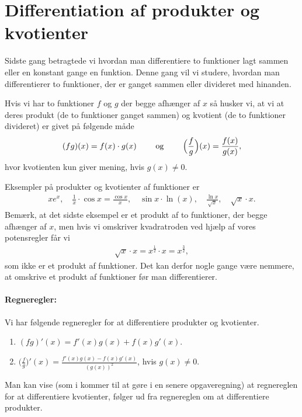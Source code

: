 \section{Differentiation af produkter og kvotienter}
\noindent Sidste gang betragtede vi hvordan man differentiere to funktioner lagt sammen eller en konstant gange en funktion. Denne gang vil vi studere, hvordan man differentierer to funktioner, der er ganget sammen eller divideret med hinanden.

Hvis vi har to funktioner $f$ og $g$ der begge afhænger af $x$ så husker vi, at vi at deres produkt (de to funktioner ganget sammen) og kvotient (de to funktioner divideret) er givet på følgende måde
\begin{align*}
(fg)(x)=f(x) \cdot g(x) \qquad \textup{ og } \qquad \Big(\frac{f}{g}\Big) (x) = \frac{f(x)}{g(x)},
\end{align*}
hvor kvotienten kun giver mening, hvis $g(x) \neq 0$.

Eksempler på produkter og kvotienter af funktioner er
\begin{align*}
xe^x, \quad \frac{1}{x} \cdot \cos x = \frac{\cos x}{x},\quad \sin x \cdot \ln(x),\quad \frac{\ln x}{\sqrt{x}}, \quad \sqrt{x}\cdot x.
\end{align*}
Bemærk, at det sidste eksempel er et produkt af to funktioner, der begge afhænger af $x$, men hvis vi omskriver kvadratroden ved hjælp af vores potensregler får vi
\begin{align*}
\sqrt{x}\cdot x = x^{\frac{1}{2}} \cdot x = x^\frac{3}{2},
\end{align*}
som ikke er et produkt af funktioner. Det kan derfor nogle gange være nemmere, at omskrive et produkt af funktioner før man differentierer.

\paragraph*{Regneregler:}
Vi har følgende regneregler for at differentiere produkter og kvotienter.
\begin{enumerate}
\item $(fg)'(x)=f'(x)g(x)+f(x)g'(x)$.
\item $\displaystyle \Big( \frac{f}{g} \Big)'(x) = \frac{f'(x)g(x)-f(x)g'(x)}{(g(x))^2}$, hvis $g(x) \neq 0$.
\end{enumerate}
Man kan vise (som i kommer til at gøre i en senere opgaveregning) at regnereglen for at differentiere kvotienter, følger ud fra regnereglen om at differentiere produkter.

